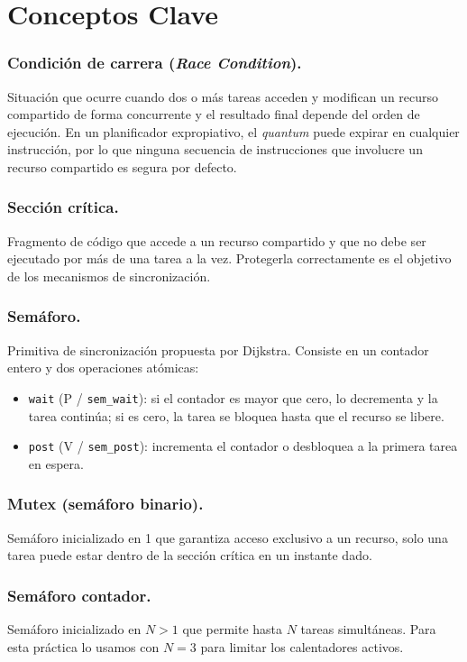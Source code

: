 \documentclass[12pt,letterpaper]{article}
\begin{document}
\newpage

\section*{Conceptos Clave}

\subsubsection*{Condición de carrera (\textit{Race Condition}).}
Situación que ocurre cuando dos o más tareas acceden y modifican un recurso compartido de forma concurrente y el resultado final depende del orden de ejecución. En un planificador expropiativo, el \textit{quantum} puede expirar en cualquier instrucción, por lo que ninguna secuencia de instrucciones que involucre un recurso compartido es segura por defecto.

\subsubsection*{Sección crítica.}
Fragmento de código que accede a un recurso compartido y que no debe ser ejecutado por más de una tarea a la vez. Protegerla correctamente es el objetivo de los mecanismos de sincronización.

\subsubsection*{Semáforo.}
Primitiva de sincronización propuesta por Dijkstra. Consiste en un contador entero y dos operaciones atómicas:
\begin{itemize}
\item \texttt{wait} (P / \texttt{sem\_wait}): si el contador es mayor que cero, lo decrementa y la tarea continúa; si es cero, la tarea se bloquea hasta que el recurso se libere.
\item \texttt{post} (V / \texttt{sem\_post}): incrementa el contador o desbloquea a la primera tarea en espera.
\end{itemize}

\subsubsection*{Mutex (semáforo binario).}
Semáforo inicializado en 1 que garantiza acceso exclusivo a un recurso, solo una tarea puede estar dentro de la sección crítica en un instante dado.

\subsubsection*{Semáforo contador.}
Semáforo inicializado en $N > 1$ que permite hasta $N$ tareas simultáneas. Para esta práctica lo usamos con $N = 3$ para limitar los calentadores activos.
\end{document}
